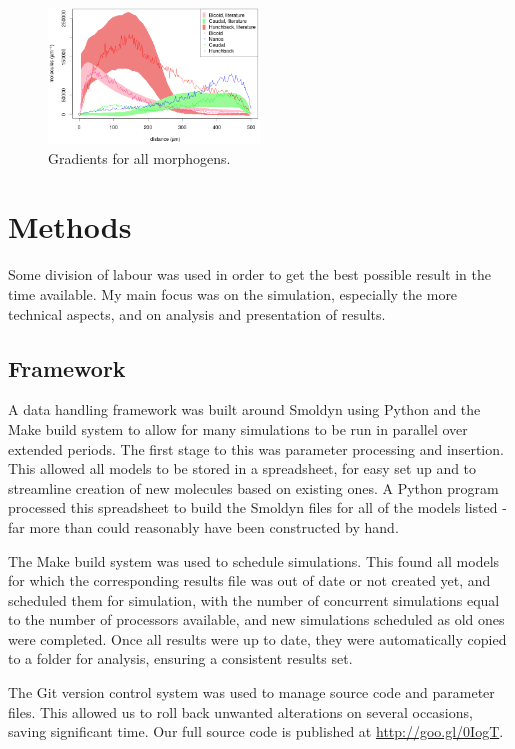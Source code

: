 \documentclass[11pt,a4paper,twocolumn]{article}
\begin{document}
\begin{figure}[h!]
  \centering
    \includegraphics[width=0.5\textwidth]{writeup-all}
  \caption{Gradients for all morphogens. \label{fig:all}}
\end{figure}

\section{Methods}
Some division of labour was used in order to get the best possible result in the time available. My main focus was on the simulation, especially the more technical aspects, and on analysis and presentation of results.

\subsection{Framework}
A data handling framework was built around Smoldyn using Python and the Make build system to allow for many simulations to be run in parallel over extended periods. The first stage to this was parameter processing and insertion. This allowed all models to be stored in a spreadsheet, for easy set up and to streamline creation of new molecules based on existing ones. A Python program processed this spreadsheet to build the Smoldyn files for all of the models listed - far more than could reasonably have been constructed by hand. 

The Make build system was used to schedule simulations. This found all models for which the corresponding results file was out of date or not created yet, and scheduled them for simulation, with the number of concurrent simulations equal to the number of processors available, and new simulations scheduled as old ones were completed. Once all results were up to date, they were automatically copied to a folder for analysis, ensuring a consistent results set.

The Git version control system was used to manage source code and parameter files. This allowed us to roll back unwanted alterations on several occasions, saving significant time. Our full source code is published at \url{http://goo.gl/0IogT}.
\end{document}
